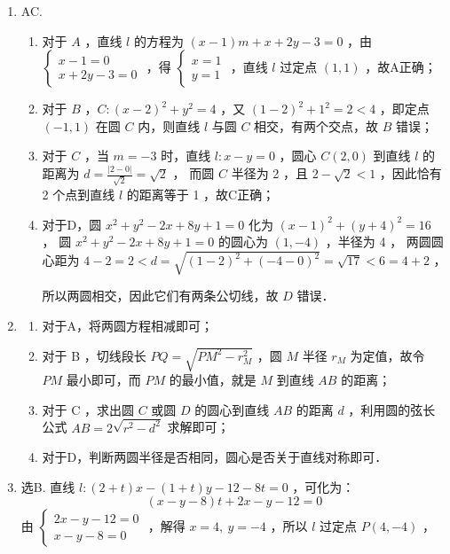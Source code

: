\begin{tips}
    \begin{enumerate}
        \item AC.
              \begin{enumerate}
                  \item 对于 $A$ ，直线 $l$ 的方程为 $(x-1) m+x+2 y-3=0$ ，由 $\left\{\begin{array}{l}x-1=0 \\ x+2 y-3=0\end{array}\right.$ ，得 $\left\{\begin{array}{l}x=1 \\ y=1\end{array}\right.$ ，直线 $l$ 过定点 $(1,1)$ ，故A正确；
                  \item 对于 $B$ ，$C:(x-2)^2+y^2=4$ ，又 $(1-2)^2+1^2=2<4$ ，即定点 $(-1,1)$ 在圆 $C$ 内，则直线 $l$ 与圆 $C$ 相交，有两个交点，故 $B$ 错误；
                  \item 对于 $C$ ，当 $m=-3$ 时，直线 $l: x-y=0$ ，圆心 $C(2,0)$ 到直线 $l$ 的距离为 $d=\frac{|2-0|}{\sqrt{2}}=\sqrt{2}$ ，
                        而圆 $C$ 半径为 2 ，且 $2-\sqrt{2}<1$ ，因此恰有 2 个点到直线 $l$ 的距离等于 1 ，故C正确；
                  \item 对于D，圆 $x^2+y^2-2 x+8 y+1=0$ 化为 $(x-1)^2+(y+4)^2=16$ ，
                        圆 $x^2+y^2-2 x+8 y+1=0$ 的圆心为 $(1,-4)$ ，半径为 4 ，
                        两圆圆心距为 $4-2=2<d=\sqrt{(1-2)^2+(-4-0)^2}=\sqrt{17}<6=4+2$ ，

                        所以两圆相交，因此它们有两条公切线，故 $D$ 错误．
              \end{enumerate}

        \item \begin{enumerate}
                  \item 对于A，将两圆方程相减即可；
                  \item 对于 B ，切线段长 $P Q=\sqrt{P M^2-r_M^2}$ ，圆 $M$ 半径 $r_M$ 为定值，故令 $P M$ 最小即可，而 $P M$ 的最小值，就是 $M$ 到直线 $A B$ 的距离；
                  \item 对于 C ，求出圆 $C$ 或圆 $D$ 的圆心到直线 $A B$ 的距离 $d$ ，利用圆的弦长公式 $A B=2 \sqrt{r^2-d^2}$ 求解即可；
                  \item 对于D，判断两圆半径是否相同，圆心是否关于直线对称即可．
              \end{enumerate}
        \item 选B. 直线 $l:(2+t) x-(1+t) y-12-8 t=0$ ，可化为：
              $$
                  (x-y-8) t+2 x-y-12=0
              $$
              由 $\left\{\begin{array}{c}2 x-y-12=0 \\ x-y-8=0\end{array}\right.$ ，解得 $x=4, ~ y=-4$ ，所以 $l$ 过定点 $P(4,-4)$ ，


\end{enumerate}
\end{tips}
